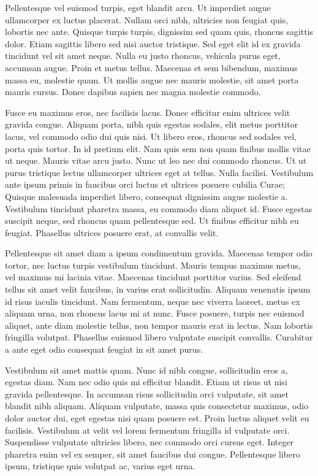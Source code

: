 \documentclass[10pt]{article}
\begin{document}
	Pellentesque vel euismod turpis, eget blandit arcu. Ut imperdiet augue ullamcorper ex luctus placerat. Nullam orci nibh, ultricies non feugiat quis, lobortis nec ante. Quisque turpis turpis, dignissim sed quam quis, rhoncus sagittis dolor. Etiam sagittis libero sed nisi auctor tristique. Sed eget elit id ex gravida tincidunt vel sit amet neque. Nulla eu justo rhoncus, vehicula purus eget, accumsan augue. Proin et metus tellus. Maecenas et sem bibendum, maximus massa eu, molestie quam. Ut mollis augue nec mauris molestie, sit amet porta mauris cursus. Donec dapibus sapien nec magna molestie commodo.
	
	Fusce eu maximus eros, nec facilisis lacus. Donec efficitur enim ultrices velit gravida congue. Aliquam porta, nibh quis egestas sodales, elit metus porttitor lacus, vel commodo odio dui quis nisi. Ut libero eros, rhoncus sed sodales vel, porta quis tortor. In id pretium elit. Nam quis sem non quam finibus mollis vitae ut neque. Mauris vitae arcu justo. Nunc ut leo nec dui commodo rhoncus. Ut ut purus tristique lectus ullamcorper ultrices eget at tellus. Nulla facilisi. Vestibulum ante ipsum primis in faucibus orci luctus et ultrices posuere cubilia Curae; Quisque malesuada imperdiet libero, consequat dignissim augue molestie a. Vestibulum tincidunt pharetra massa, eu commodo diam aliquet id. Fusce egestas suscipit neque, sed rhoncus quam pellentesque sed. Ut finibus efficitur nibh eu feugiat. Phasellus ultrices posuere erat, at convallis velit.
	
	Pellentesque sit amet diam a ipsum condimentum gravida. Maecenas tempor odio tortor, nec luctus turpis vestibulum tincidunt. Mauris tempus maximus metus, vel maximus mi lacinia vitae. Maecenas tincidunt porttitor varius. Sed eleifend tellus sit amet velit faucibus, in varius erat sollicitudin. Aliquam venenatis ipsum id risus iaculis tincidunt. Nam fermentum, neque nec viverra laoreet, metus ex aliquam urna, non rhoncus lacus mi at nunc. Fusce posuere, turpis nec euismod aliquet, ante diam molestie tellus, non tempor mauris erat in lectus. Nam lobortis fringilla volutpat. Phasellus euismod libero vulputate suscipit convallis. Curabitur a ante eget odio consequat feugiat in sit amet purus.
	
	Vestibulum sit amet mattis quam. Nunc id nibh congue, sollicitudin eros a, egestas diam. Nam nec odio quis mi efficitur blandit. Etiam ut risus ut nisi gravida pellentesque. In accumsan risus sollicitudin orci vulputate, sit amet blandit nibh aliquam. Aliquam vulputate, massa quis consectetur maximus, odio dolor auctor dui, eget egestas nisi quam posuere est. Proin luctus aliquet velit eu facilisis. Vestibulum at velit vel lorem fermentum fringilla id vulputate orci. Suspendisse vulputate ultricies libero, nec commodo orci cursus eget. Integer pharetra enim vel ex semper, sit amet faucibus dui congue. Pellentesque libero ipsum, tristique quis volutpat ac, varius eget urna.
	
\end{document}
